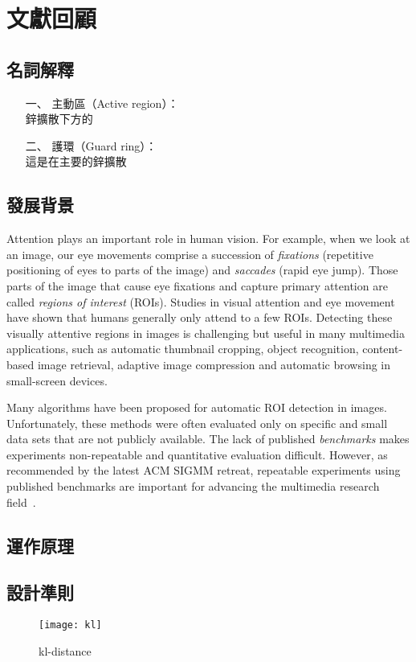 \chapter{文獻回顧}
\label{c:related}
\section{名詞解釋}
\begin{itemize}
	\item[一、]主動區（Active region）：\\[5pt]
	鋅擴散下方的
	\item[二、]護環（Guard ring）：\\[5pt]
	\hspace*{4mm} 這是在主要的鋅擴散
\end{itemize}
\section{發展背景}
Attention plays an important role in human vision. For example, when
we look at an image, our eye movements comprise a succession of {\em
fixations} (repetitive positioning of eyes to parts of the image)
and {\em saccades} (rapid eye jump). Those parts of the image that
cause eye fixations and capture primary attention are called {\em
regions of interest} (ROIs). Studies in visual attention and eye
movement have shown that humans generally only attend to a few ROIs.
Detecting these visually attentive regions in images is challenging
but useful in many multimedia applications, such as automatic
thumbnail cropping, object recognition, content-based image
retrieval, adaptive image compression and automatic browsing in
small-screen devices.

Many algorithms have been proposed for automatic ROI detection in
images. Unfortunately, these methods were often evaluated only on
specific and small data sets that are not publicly available. The
lack of published {\em benchmarks} makes experiments non-repeatable
and quantitative evaluation difficult. However, as recommended by
the latest ACM SIGMM retreat, repeatable experiments using published
benchmarks are important for advancing the multimedia research
field~\cite{Rowe:2005:ASR}.
\section{運作原理}
\section{設計準則}
\begin{figure}
\centering
\texttt{[image: kl]}
\caption{kl-distance}
\label{kl}
\end{figure}

